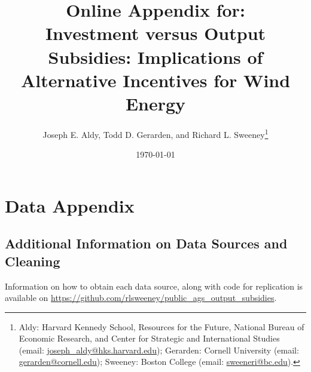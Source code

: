 \documentclass[12pt]{article}
\begin{document}
\thispagestyle{plain}

\title{Online Appendix for: \\ Investment versus Output Subsidies: Implications of Alternative Incentives for Wind Energy}
\author{Joseph E. Aldy, Todd D. Gerarden, and Richard L. Sweeney\thanks{Aldy: Harvard Kennedy School, Resources for the Future, National Bureau of Economic Research, and Center for Strategic and International Studies (email: \href{mailto:joseph_aldy@hks.harvard.edu}{joseph\_{}aldy@hks.harvard.edu}); Gerarden: Cornell University (email: \href{mailto:gerarden@cornell.edu}{gerarden@cornell.edu}); Sweeney: Boston College (email: \href{mailto:sweeneri@bc.edu}{sweeneri@bc.edu}).}}
\date{\monthyeardate\today}

\clearpage
\maketitle
\thispagestyle{empty}

\tableofcontents


\appendix

\makeatletter
\def\@seccntformat#1{\csname Pref@#1\endcsname \csname the#1\endcsname\quad}
\def\Pref@section{Appendix~}
\makeatother



\clearpage
\section{Data Appendix \label{sec:Data_Appendix}}

\subsection{Additional Information on Data Sources and Cleaning}

Information on how to obtain each data source, along with code for replication is available on \href{https://github.com/rlsweeney/public_ags_output_subsidies}{https://github.com/rlsweeney/public\_ags\_output\_subsidies}. 
\end{document}
